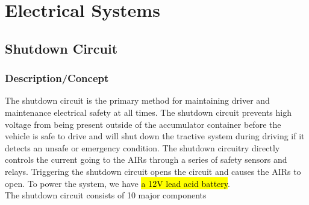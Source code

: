 \documentclass{article}
\DeclareRobustCommand{\hlr}[1]{{\sethlcolor{red}\hl{#1}}}
\begin{document}
\newpage

\section{Electrical Systems}

    \subsection{Shutdown Circuit}

        \subsubsection{Description/Concept}

            The shutdown circuit is the primary method for maintaining driver and maintenance electrical safety at all times. The shutdown circuit prevents high voltage from being present outside of the accumulator container before the vehicle is safe to drive and will shut down the tractive system during driving if it detects an unsafe or emergency condition. The shutdown circuitry directly controls the current going to the AIRs through a series of safety sensors and relays. Triggering the shutdown circuit opens the circuit and causes the AIRs to open. To power the system, we have \hlr{a 12V lead acid battery}.  \\

            The shutdown circuit consists of 10 major components
\end{document}
